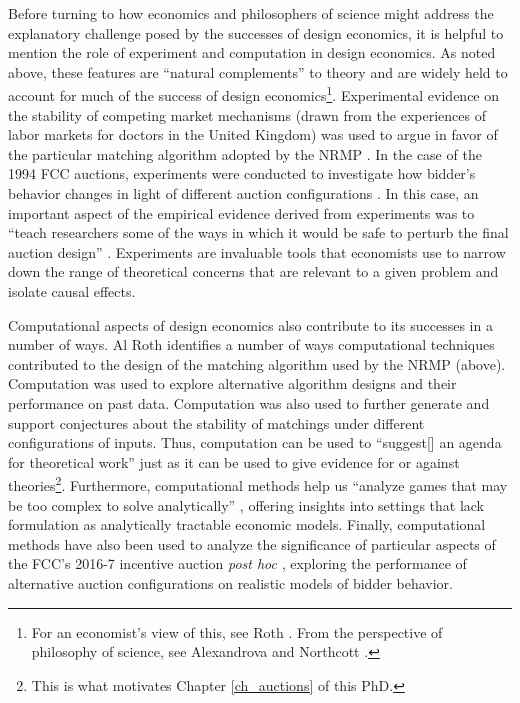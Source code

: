 Before turning to how economics and philosophers of science might address the explanatory challenge posed by the successes of design economics, it is helpful to mention the role of experiment and computation in design economics. As noted above, these features are ``natural complements'' \autocite[1342]{roth2002} to theory and are widely held to account for much of the success of design economics\footnote{For an economist's view of this, see Roth \autocite*{roth2002}. From the perspective of philosophy of science, see Alexandrova and Northcott \autocite*{alexandrova2009}.}. Experimental evidence on the stability of competing market mechanisms (drawn from the experiences of labor markets for doctors in the United Kingdom) was used to argue in favor of the particular matching algorithm adopted by the NRMP \autocite{kagel2000}. In the case of the 1994 FCC auctions, experiments were conducted to investigate how bidder's behavior changes in light of different auction configurations \autocite{plott1997}. In this case, an important aspect of the empirical evidence derived from experiments was to ``teach researchers some of the ways in which it would be safe to perturb the final auction design'' \autocite[320]{alexandrova2009}. Experiments are invaluable tools that economists use to narrow down the range of theoretical concerns that are relevant to a given problem and isolate causal effects.     

Computational aspects of design economics also contribute to its successes in a number of ways. Al Roth \autocite*{roth2002} identifies a number of ways computational techniques contributed to the design of the matching algorithm used by the NRMP (above). Computation was used to explore alternative algorithm designs and their performance on past data. Computation was also used to further generate and support conjectures about the stability of matchings under different configurations of inputs. Thus, computation can be used to ``suggest[] an agenda for theoretical work'' \autocite[1363]{roth2002} just as it can be used to give evidence for or against theories\footnote{This is what motivates Chapter \ref{ch_auctions} of this PhD.}. Furthermore, computational methods help us ``analyze games that may be too complex to solve analytically'' \autocite[1374]{roth2002}, offering insights into settings that lack formulation as analytically tractable economic models. Finally, computational methods have also been used to analyze the significance of particular aspects of the FCC's 2016-7 incentive auction \textit{post hoc} \autocite{newman2024}, exploring the performance of alternative auction configurations on realistic models of bidder behavior.

